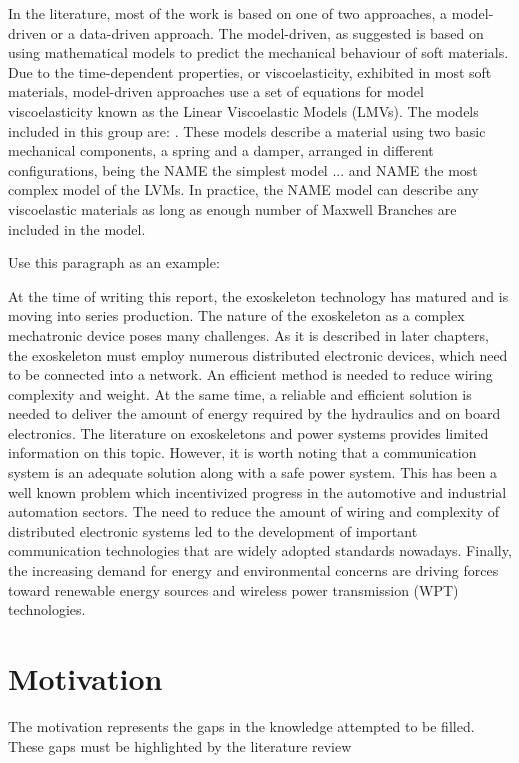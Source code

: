 In the literature, most of the work is based on one of two approaches, a model-driven or a data-driven approach. The model-driven, as suggested is based on using mathematical models to predict the mechanical behaviour of soft materials. Due to the time-dependent properties, or viscoelasticity, exhibited in most soft materials, model-driven approaches use a set of equations for model viscoelasticity known as the Linear Viscoelastic Models (LMVs). The models included in this group are: . These models describe a material using two basic mechanical components, a spring and a damper, arranged in different configurations, being the NAME the simplest model ... and NAME the most complex model of the LVMs. In practice, the NAME model can describe any viscoelastic materials as long as enough number of Maxwell Branches are included in the model.


Use this paragraph as an example:

At the time of writing this report, the exoskeleton technology has matured and is moving into series production. The nature of the exoskeleton as a complex mechatronic device poses many challenges. As it is described in later chapters, the exoskeleton must employ numerous distributed electronic devices, which need to be connected into a network. An efficient method is needed to reduce wiring complexity and weight. At the same time, a reliable and efficient solution is needed to deliver the amount of energy required by the hydraulics and on board electronics. The literature on exoskeletons and power systems provides limited information on this topic. However, it is worth noting that a communication system is an adequate solution along with a safe power system. This has been a well known problem which incentivized progress in the automotive and industrial automation sectors. The need to reduce the amount of wiring and complexity of distributed electronic systems led to the development of important communication technologies that are widely adopted standards nowadays. Finally, the increasing demand for energy and environmental concerns are driving forces toward renewable energy sources and wireless power transmission (WPT) technologies.

\section{Motivation}

\Large { The motivation represents the gaps in the knowledge attempted to be filled. These gaps must be highlighted by the literature review }

